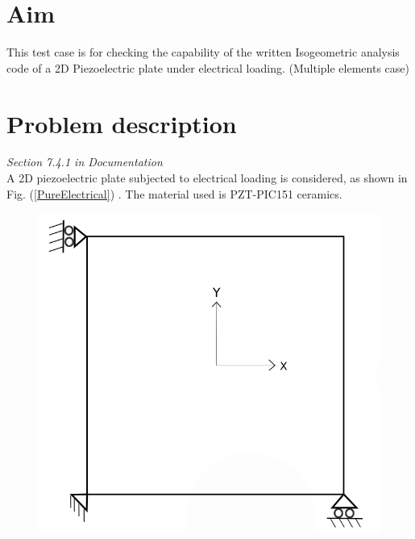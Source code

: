 \documentclass[12pt]{article}
\begin{document}
\section{Aim}
This test case is for checking the capability of the written Isogeometric analysis code of a 2D Piezoelectric plate under electrical loading. (Multiple elements case)
\section{Problem description} \label{2DPPWEL}
\emph{Section 7.4.1 in Documentation}\\
A 2D piezoelectric plate subjected to electrical loading is considered, as shown in Fig. (\ref{PureElectrical}) . The material used is PZT-PIC151 ceramics.
\begin{figure}[H]
	\centering
	\begin{minipage}{.5\textwidth}
		\centering
		\includegraphics[width=0.8\linewidth]{2DPlate.png}
		\label{2Dplate}
	\end{minipage}%
	\begin{minipage}{.4\textwidth}
		\centering

\end{minipage}
\end{figure}
\end{document}
